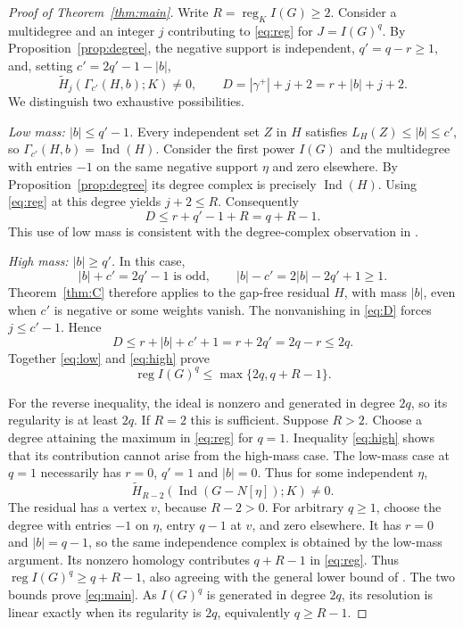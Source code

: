 \documentclass[11pt,a4paper]{article}
\theoremstyle{definition}
\newcommand{\reg}{\operatorname{reg}}
\newcommand{\Ind}{\operatorname{Ind}}
\newcommand{\Ht}{\widetilde H}
\newcommand{\G}{\Gamma}
\begin{document}
\begin{proof}[Proof of Theorem~\ref{thm:main}]
Write $R=\reg_K I(G)\geq2$. Consider a multidegree and an integer $j$ contributing to \eqref{eq:reg} for $J=I(G)^q$. By Proposition~\ref{prop:degree}, the negative support is independent, $q'=q-r\geq1$, and, setting $c'=2q'-1-|b|$,
\begin{equation}\label{eq:D}
 \Ht_j(\G_{c'}(H,b);K)\ne0,
 \qquad D=|\gamma^+|+j+2=r+|b|+j+2.
\end{equation}
We distinguish two exhaustive possibilities.

\emph{Low mass: $|b|\leq q'-1$.} Every independent set $Z$ in $H$ satisfies $L_H(Z)\leq|b|\leq c'$, so $\G_{c'}(H,b)=\Ind(H)$. Consider the first power $I(G)$ and the multidegree with entries $-1$ on the same negative support $\eta$ and zero elsewhere. By Proposition~\ref{prop:degree} its degree complex is precisely $\Ind(H)$. Using \eqref{eq:reg} at this degree yields $j+2\leq R$. Consequently
\begin{equation}\label{eq:low}
 D\leq r+q'-1+R=q+R-1.
\end{equation}
This use of low mass is consistent with the degree-complex observation in \cite[Lemma 2.15]{MV}.

\emph{High mass: $|b|\geq q'$.} In this case,
\[
 |b|+c'=2q'-1\text{ is odd},\qquad |b|-c'=2|b|-2q'+1\geq1.
\]
Theorem~\ref{thm:C} therefore applies to the gap-free residual $H$, with mass $|b|$, even when $c'$ is negative or some weights vanish. The nonvanishing in \eqref{eq:D} forces $j\leq c'-1$. Hence
\begin{equation}\label{eq:high}
 D\leq r+|b|+c'+1=r+2q'=2q-r\leq2q.
\end{equation}
Together \eqref{eq:low} and \eqref{eq:high} prove
\[
 \reg I(G)^q\leq\max\{2q,q+R-1\}.
\]

For the reverse inequality, the ideal is nonzero and generated in degree $2q$, so its regularity is at least $2q$. If $R=2$ this is sufficient. Suppose $R>2$. Choose a degree attaining the maximum in \eqref{eq:reg} for $q=1$. Inequality \eqref{eq:high} shows that its contribution cannot arise from the high-mass case. The low-mass case at $q=1$ necessarily has $r=0$, $q'=1$ and $|b|=0$. Thus for some independent $\eta$,
\[
 \Ht_{R-2}(\Ind(G-N[\eta]);K)\ne0.
\]
The residual has a vertex $v$, because $R-2>0$. For arbitrary $q\geq1$, choose the degree with entries $-1$ on $\eta$, entry $q-1$ at $v$, and zero elsewhere. It has $r=0$ and $|b|=q-1$, so the same independence complex is obtained by the low-mass argument. Its nonzero homology contributes $q+R-1$ in \eqref{eq:reg}. Thus $\reg I(G)^q\geq q+R-1$, also agreeing with the general lower bound of \cite[Lemma 2.16]{MV}. The two bounds prove \eqref{eq:main}. As $I(G)^q$ is generated in degree $2q$, its resolution is linear exactly when its regularity is $2q$, equivalently $q\geq R-1$.
\end{proof}
\end{document}
